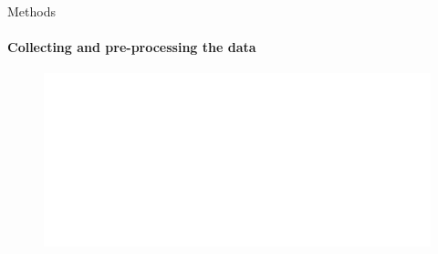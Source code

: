 \documentclass[9pt]{beamer}
\begin{document}
	\begin{frame}{Methods}
	\framesubtitle{Collecting and pre-processing the data}
    \begin{figure}[t]
	    \begin{minipage}[l]{1\columnwidth}
	    \centering
	    \includegraphics[width=1\textwidth]{images/logo/unipd_logo_white.png}
        \label{fig:}
        \end{minipage}
    \end{figure}
	\end{frame}
	
	
	
 
\end{document}
